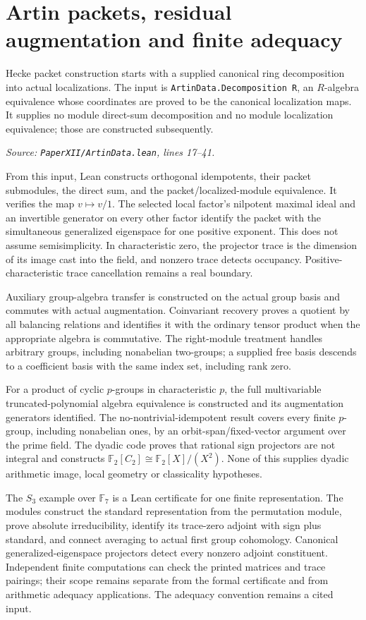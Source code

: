 \documentclass[11pt]{article}
\newcommand{\code}[1]{\nolinkurl{#1}}
\newcommand{\excerpt}[3]{\par\smallskip\textit{Source: \code{PaperXII/#1.lean}, lines #2--#3.}\par\VerbatimInput[fontsize=\scriptsize,breaklines=true,breakanywhere=true,numbers=left,numbersep=4pt,firstline=#2,lastline=#3,firstnumber=#2,frame=lines]{excerpts/#1.display.txt}\par}
\begin{document}
\section{Artin packets, residual augmentation and finite adequacy}
Hecke packet construction starts with a supplied canonical ring decomposition into actual localizations. The input is \code{ArtinData.Decomposition R}, an \(R\)-algebra equivalence whose coordinates are proved to be the canonical localization maps. It supplies no module direct-sum decomposition and no module localization equivalence; those are constructed subsequently.
\excerpt{ArtinData}{17}{41}

From this input, Lean constructs orthogonal idempotents, their packet submodules, the direct sum, and the packet/localized-module equivalence. It verifies the map \(v\mapsto v/1\). The selected local factor's nilpotent maximal ideal and an invertible generator on every other factor identify the packet with the simultaneous generalized eigenspace for one positive exponent. This does not assume semisimplicity. In characteristic zero, the projector trace is the dimension of its image cast into the field, and nonzero trace detects occupancy. Positive-characteristic trace cancellation remains a real boundary.

Auxiliary group-algebra transfer is constructed on the actual group basis and commutes with actual augmentation. Coinvariant recovery proves a quotient by all balancing relations and identifies it with the ordinary tensor product when the appropriate algebra is commutative. The right-module treatment handles arbitrary groups, including nonabelian two-groups; a supplied free basis descends to a coefficient basis with the same index set, including rank zero.

For a product of cyclic \(p\)-groups in characteristic \(p\), the full multivariable truncated-polynomial algebra equivalence is constructed and its augmentation generators identified. The no-nontrivial-idempotent result covers every finite \(p\)-group, including nonabelian ones, by an orbit-span/fixed-vector argument over the prime field. The dyadic code proves that rational sign projectors are not integral and constructs \(\mathbb F_2[C_2]\cong\mathbb F_2[X]/(X^2)\). None of this supplies dyadic arithmetic image, local geometry or classicality hypotheses.

The \(S_3\) example over \(\mathbb F_7\) is a Lean certificate for one finite representation. The modules construct the standard representation from the permutation module, prove absolute irreducibility, identify its trace-zero adjoint with sign plus standard, and connect averaging to actual first group cohomology. Canonical generalized-eigenspace projectors detect every nonzero adjoint constituent. Independent finite computations can check the printed matrices and trace pairings; their scope remains separate from the formal certificate and from arithmetic adequacy applications. The adequacy convention remains a cited input.
\end{document}
